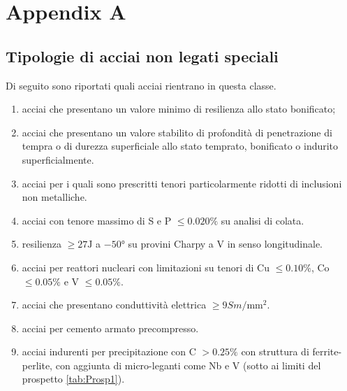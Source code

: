 
\chapter{Appendix A}\label{app:sus}
\section{Tipologie di acciai non legati speciali}\label{sec:ANLS}
Di seguito sono riportati quali acciai rientrano in questa classe. 
\begin{enumerate}
\item acciai che presentano un valore minimo di resilienza allo stato bonificato;
\item acciai che presentano un valore stabilito di profondità di penetrazione di tempra o di durezza superficiale allo stato temprato, bonificato o indurito superficialmente.
\item acciai per i quali sono prescritti tenori particolarmente ridotti di inclusioni non metalliche.
\item acciai con tenore massimo di S e P $\leq 0.020\%$ su analisi di colata.
\item resilienza $\geq 27\unit{\J}$ a $-50\unit{\degree}$ su provini Charpy a V in senso longitudinale.
\item acciai per reattori nucleari con limitazioni su tenori di Cu $\leq 0.10\%$, Co $\leq 0.05\%$ e V $\leq 0.05\%$.
\item acciai che presentano conduttività elettrica $\geq 9\unit{Sm/\mm^2}$.
\item acciai per cemento armato precompresso.
\item acciai indurenti per precipitazione con C $>0.25\%$ con struttura di ferrite-perlite, con aggiunta di micro-leganti come Nb e V (sotto ai limiti del prospetto \ref{tab:Prosp1}).
\end{enumerate}

